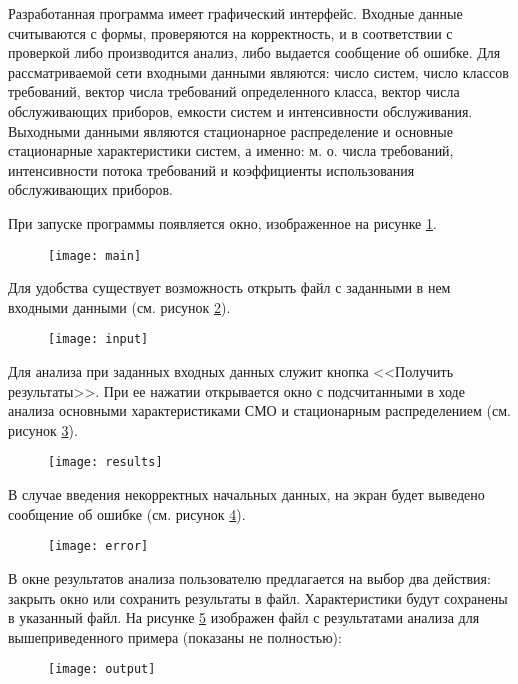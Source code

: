 Разработанная программа имеет графический интерфейс. Входные данные считываются с формы, проверяются на корректность, и в соответствии с проверкой либо производится анализ, либо выдается сообщение об ошибке. Для рассматриваемой сети входными данными являются: число систем, число классов требований, вектор числа требований определенного класса, вектор числа обслуживающих приборов, емкости систем и интенсивности обслуживания. Выходными данными являются стационарное распределение и основные стационарные характеристики систем, а именно: м. о. числа требований, интенсивности потока требований и коэффициенты использования обслуживающих приборов.

При запуске программы появляется окно, изображенное на рисунке \ref{fig:main}.
\begin{figure}[H]
  \centering
  \texttt{[image: main]}
  \caption{}
  \label{fig:main}
\end{figure}

Для удобства существует возможность открыть файл с заданными в нем входными данными (см. рисунок \ref{fig:input}).
\begin{figure}[H]
  \centering
  \texttt{[image: input]}
  \caption{}
  \label{fig:input}
\end{figure}

Для анализа при заданных входных данных служит кнопка <<Получить результаты>>. При ее нажатии открывается окно с подсчитанными в ходе анализа основными характеристиками СМО и стационарным распределением (см. рисунок \ref{fig:results}).
\begin{figure}[H]
  \centering
  \texttt{[image: results]}
  \caption{}
  \label{fig:results}
\end{figure}

В случае введения некорректных начальных данных, на экран будет выведено сообщение об ошибке (см. рисунок \ref{fig:error}).
\begin{figure}[H]
  \centering
  \texttt{[image: error]}
  \caption{}
  \label{fig:error}
\end{figure}

В окне результатов анализа пользователю предлагается на выбор два действия: закрыть окно или сохранить результаты в файл. Характеристики будут сохранены в указанный файл. На рисунке \ref{fig:output} изображен файл с результатами анализа для вышеприведенного примера (показаны не полностью):
\begin{figure}[H]
  \centering
  \texttt{[image: output]}
  \caption{}
  \label{fig:output}
\end{figure}


